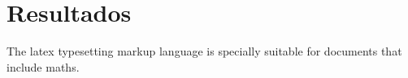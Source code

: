 \chapter{Resultados}
The \gls{latex} typesetting markup language is specially suitable
for documents that include \gls{maths}.